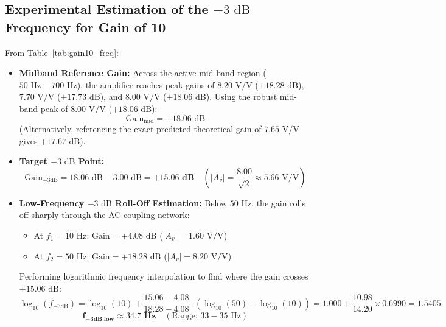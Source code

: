 \documentclass[11pt,a4paper]{article}
\begin{document}
\subsection{Experimental Estimation of the $-3\text{ dB}$ Frequency for Gain of 10}
From Table~\ref{tab:gain10_freq}:
\begin{itemize}
    \item \textbf{Midband Reference Gain:} Across the active mid-band region ($50\text{ Hz} - 700\text{ Hz}$), the amplifier reaches peak gains of $8.20\text{ V/V}$ ($+18.28\text{ dB}$), $7.70\text{ V/V}$ ($+17.73\text{ dB}$), and $8.00\text{ V/V}$ ($+18.06\text{ dB}$). Using the robust mid-band peak of $8.00\text{ V/V}$ ($+18.06\text{ dB}$):
    \begin{equation}
        \text{Gain}_{\text{mid}} = +18.06\text{ dB}
    \end{equation}
    (Alternatively, referencing the exact predicted theoretical gain of $7.65\text{ V/V}$ gives $+17.67\text{ dB}$).
    \item \textbf{Target $-3\text{ dB}$ Point:}
    \begin{equation}
        \text{Gain}_{-3\text{dB}} = 18.06\text{ dB} - 3.00\text{ dB} = \mathbf{+15.06\text{ dB}} \quad \left( |A_v| = \frac{8.00}{\sqrt{2}} \approx 5.66\text{ V/V} \right)
    \end{equation}
    \item \textbf{Low-Frequency $-3\text{ dB}$ Roll-Off Estimation:}
    Below $50\text{ Hz}$, the gain rolls off sharply through the AC coupling network:
    \begin{itemize}
        \item At $f_1 = 10\text{ Hz}$: $\text{Gain} = +4.08\text{ dB}$ ($|A_v| = 1.60\text{ V/V}$)
        \item At $f_2 = 50\text{ Hz}$: $\text{Gain} = +18.28\text{ dB}$ ($|A_v| = 8.20\text{ V/V}$)
    \end{itemize}
    Performing logarithmic frequency interpolation to find where the gain crosses $+15.06\text{ dB}$:
    \begin{equation}
        \log_{10}(f_{-3\text{dB}}) = \log_{10}(10) + \frac{15.06 - 4.08}{18.28 - 4.08} \cdot (\log_{10}(50) - \log_{10}(10)) = 1.000 + \frac{10.98}{14.20} \times 0.6990 = 1.5405
    \end{equation}
    \begin{equation}
        \mathbf{f_{-3\text{dB,low}} \approx 34.7\text{ Hz}} \quad (\text{Range: } 33 - 35\text{ Hz})
    \end{equation}
   \end{itemize}
\end{document}
